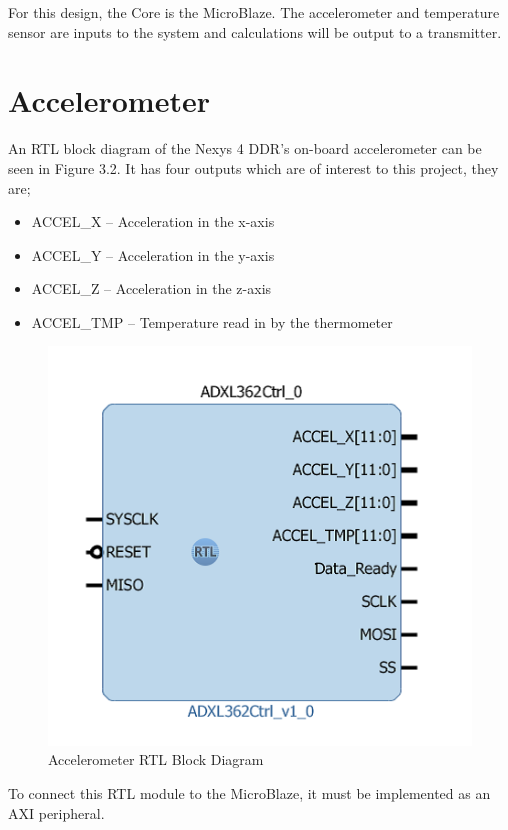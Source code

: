 \documentclass[12pt,a4paper]{report} %
\begin{document}
For this design, the Core is the MicroBlaze. The accelerometer and temperature sensor are inputs to the system and calculations will be output to a transmitter.
\section{Accelerometer}
An RTL block diagram of the Nexys 4 DDR’s on-board accelerometer can be seen in Figure 3.2.
It has four outputs which are of interest to this project, they are;
\begin{itemize}
\item ACCEL\_X – Acceleration in the x-axis
\item ACCEL\_Y – Acceleration in the y-axis
\item ACCEL\_Z – Acceleration in the z-axis
\item ACCEL\_TMP – Temperature read in by the thermometer
\end{itemize}
\begin{figure}[ht]
\centerline{\includegraphics[scale=0.6]{diagrams/image9}}
\caption{Accelerometer RTL Block Diagram}
\end{figure}

To connect this RTL module to the MicroBlaze, it must be implemented as an AXI peripheral.
\end{document}
